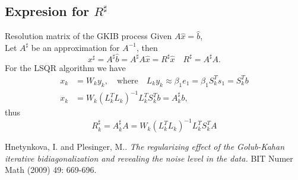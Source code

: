 \documentclass{beamer}
\begin{document}
\subsection{Expresion for $R^{\sharp}$}
\begin{frame}{Resolution matrix of the GKIB process}
  Given $A\hat{x} = \hat{b}$,\\
  Let $A^{\sharp}$ be an approximation for $A^{-1}$, then
  \begin{equation*}
    x^{\sharp} = A^{\sharp}\hat{b} = A^{\sharp}A\hat{x} = R^{\sharp}\hat{x}
    \quad R^{\sharp} = A^{\sharp}A.
  \end{equation*}
  For the LSQR algorithm we have
  \begin{align*}
    x_{k} &= W_{k}y_{k}, \quad \text{where} \quad L_{k}y_{k} \approx 
    \beta_{1}e_{1} = \beta_{1}S_{k}^{T}s_{1} = S_{k}^{T}b \\
    x_{k} &= W_{k}(L_{k}^{T}L_{k})^{-1}L_{k}^{T}S_{k}^{T}b = A^{\sharp}_{k}b,
  \end{align*}
  thus
  \begin{equation*}
    R_{k}^{\sharp} = A_{k}^{\sharp}A = 
    W_{k}(L_{k}^{T}L_{k})^{-1}L_{k}^{T}S_{k}^{T}A
  \end{equation*}
  
\end{frame}

\begin{thebibliography}{1}
    Hnetynkova, I. and Plesinger, M.. 
    \emph{The regularizing effect of the Golub-Kahan iterative bidiagonalization 
      and revealing the noise level in the data.}
      BIT Numer Math (2009) 49: 669-696.
\end{thebibliography}
\end{document}
